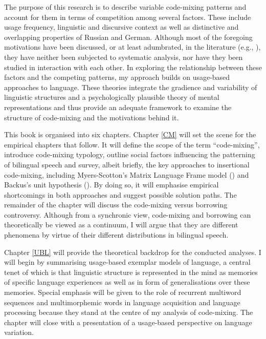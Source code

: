 The purpose of this research is to describe  variable code-mixing patterns and account for them in terms of competition among several factors. These include usage frequency, linguistic and discursive context as well as distinctive and overlapping properties of Russian and German. Although most of the foregoing motivations have been discussed, or at least adumbrated, in the literature (e.g., \citealt{myers-scotton-duelling-1993,myers-scotton-contact-2002,backus-two-1996,backus-units-2003,boumans-syntax-1998,muysken-bilingual-2000,}), they have neither been subjected to systematic analysis, nor have they been studied in interaction with each other. In exploring the relationship between these factors and the competing patterns, my approach builds on usage-based approaches to language. These theories integrate the gradience and variability of linguistic structures and a psychologically plausible theory of mental representations and thus provide an adequate framework to examine the structure of code-mixing and the motivations behind it.

\begin{sloppypar}
This book is organised into six chapters. Chapter \ref{CM} will set the scene for the empirical chapters that follow. It will define the scope of the term “code-mixing”, introduce  code-mixing typology, outline social factors influencing the patterning of bilingual speech and survey, albeit briefly, the key approaches to insertional code-mixing, including Myers-Scotton's Matrix Language Frame model (\citeyear{myers-scotton-contact-2002,myers-scotton-duelling-1993}) and Backus's unit hypothesis (\citeyear{backus-units-2003}). By doing so, it will emphasise empirical shortcomings in both approaches and suggest possible solution paths. The remainder of the chapter will discuss the code-mixing versus borrowing controversy. Although from a synchronic view, code-mixing and borrowing can theoretically be viewed as a continuum, I will argue that they are different phenomena by virtue of their different distributions in bilingual speech.
\end{sloppypar}

Chapter \ref{UBL} will provide the theoretical backdrop for the conducted analyses. I will begin by summarising usage-based exemplar models of language, a central tenet of which is that linguistic structure is represented in the mind as memories of specific language experiences as well as in form of generalisations over these memories. Special emphasis will be given to the role of recurrent multiword sequences and multimorphemic words in language acquisition and language processing because they stand at the centre of my analysis of code-mixing. The chapter will close with a presentation of a usage-based perspective on language variation.

